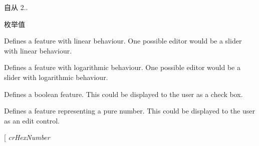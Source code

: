 \begin{DoxySince}{自从}
2.. 
\end{DoxySince}
\begin{Desc}
\item[枚举值]\par
\begin{description}
\item[{\em 
\hypertarget{group___common_interface_gga1e2d7ac6b3bb3ff1fe4bb53c4aa808eaaa76fa67da96e9ec881d4890e1ff3dbdf}{cr\+Linear}\label{group___common_interface_gga1e2d7ac6b3bb3ff1fe4bb53c4aa808eaaa76fa67da96e9ec881d4890e1ff3dbdf}
}]Defines a feature with linear behaviour. One possible editor would be a slider with linear behaviour. \item[{\em 
\hypertarget{group___common_interface_gga1e2d7ac6b3bb3ff1fe4bb53c4aa808eaa0a3f71437bbe54f5b6739d10b1769eff}{cr\+Logarithmic}\label{group___common_interface_gga1e2d7ac6b3bb3ff1fe4bb53c4aa808eaa0a3f71437bbe54f5b6739d10b1769eff}
}]Defines a feature with logarithmic behaviour. One possible editor would be a slider with logarithmic behaviour. \item[{\em 
\hypertarget{group___common_interface_gga1e2d7ac6b3bb3ff1fe4bb53c4aa808eaae1b012e21eab5941fd655f8ecf965151}{cr\+Boolean}\label{group___common_interface_gga1e2d7ac6b3bb3ff1fe4bb53c4aa808eaae1b012e21eab5941fd655f8ecf965151}
}]Defines a boolean feature. This could be displayed to the user as a check box. \item[{\em 
\hypertarget{group___common_interface_gga1e2d7ac6b3bb3ff1fe4bb53c4aa808eaaa8a1cca35150b94862986394852e32fc}{cr\+Pure\+Number}\label{group___common_interface_gga1e2d7ac6b3bb3ff1fe4bb53c4aa808eaaa8a1cca35150b94862986394852e32fc}
}]Defines a feature representing a pure number. This could be displayed to the user as an edit control. \item[{\em 
\hypertarget{group___common_interface_gga1e2d7ac6b3bb3ff1fe4bb53c4aa808eaa1d886bc9a0e01789431ea33f04855554}{cr\+Hex\+Number}\label{group___common_interface_gga1e2d7ac6b3bb3ff1fe4bb53c4aa808eaa1d886bc9a0e01789431ea33f04855554}
}
\end{description}
\end{Desc}
